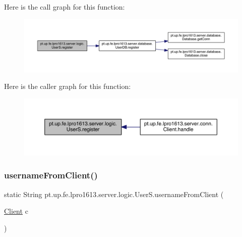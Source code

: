 Here is the call graph for this function\+:
\nopagebreak
\begin{figure}[H]
\begin{center}
\leavevmode
\includegraphics[width=350pt]{classpt_1_1up_1_1fe_1_1lpro1613_1_1server_1_1logic_1_1_user_s_ae46d3839ba68eb377aff71f23e3b3936_cgraph}
\end{center}
\end{figure}
Here is the caller graph for this function\+:
\nopagebreak
\begin{figure}[H]
\begin{center}
\leavevmode
\includegraphics[width=350pt]{classpt_1_1up_1_1fe_1_1lpro1613_1_1server_1_1logic_1_1_user_s_ae46d3839ba68eb377aff71f23e3b3936_icgraph}
\end{center}
\end{figure}
\hypertarget{classpt_1_1up_1_1fe_1_1lpro1613_1_1server_1_1logic_1_1_user_s_a26c28666f4e6461ee06eecfe1f55356d}{}\label{classpt_1_1up_1_1fe_1_1lpro1613_1_1server_1_1logic_1_1_user_s_a26c28666f4e6461ee06eecfe1f55356d} 
\subsubsection{\texorpdfstring{username\+From\+Client()}{usernameFromClient()}}
{\footnotesize\ttfamily static String pt.\+up.\+fe.\+lpro1613.\+server.\+logic.\+User\+S.\+username\+From\+Client (\begin{DoxyParamCaption}\item[{\hyperlink{classpt_1_1up_1_1fe_1_1lpro1613_1_1server_1_1conn_1_1_client}{Client}}]{c }\end{DoxyParamCaption})\hspace{0.3cm}{\ttfamily [static]}}

